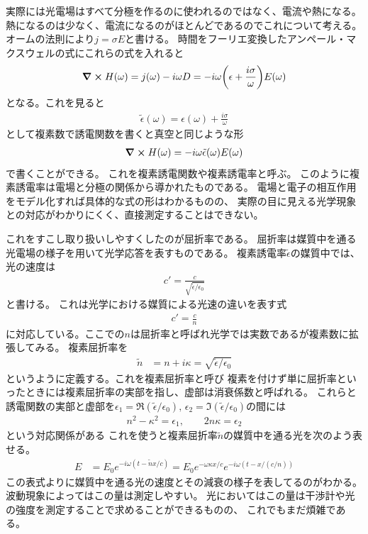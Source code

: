\documentclass[11pt,dvipdfmx,a4paper]{jsarticle}
\begin{document}
実際には光電場はすべて分極を作るのに使われるのではなく、電流や熱になる。
熱になるのは少なく、電流になるのがほとんどであるのでこれについて考える。
オームの法則により\(j=\sigma E\)と書ける。
時間をフーリエ変換したアンペール・マクスウェルの式にこれらの式を入れると
\begin{align}
    \curl H(\omega) = j(\omega) - i\omega D = -i\omega \qty(\epsilon+\frac{i\sigma}{\omega}) E(\omega)
\end{align}
となる。これを見ると
\begin{align}
    \tilde{\epsilon}(\omega) = \epsilon(\omega) + \frac{i\sigma}{\omega}
\end{align}
として複素数で誘電関数を書くと真空と同じような形
\begin{align}
    \curl H(\omega) = -i\omega \tilde{\epsilon}(\omega) E(\omega)
\end{align}
で書くことができる。
これを複素誘電関数や複素誘電率と呼ぶ。
このように複素誘電率は電場と分極の関係から導かれたものである。
電場と電子の相互作用をモデル化すれば具体的な式の形はわかるものの、
実際の目に見える光学現象との対応がわかりにくく、直接測定することはできない。

これをすこし取り扱いしやすくしたのが屈折率である。
屈折率は媒質中を通る光電場の様子を用いて光学応答を表すものである。
複素誘電率\(\tilde{\epsilon}\)の媒質中では、光の速度は
\begin{align}
    c' = \frac{c}{\sqrt{\tilde{\epsilon}/\epsilon_0}}
\end{align}
と書ける。
これは光学における媒質による光速の違いを表す式
\begin{align}
    c' = \frac{c}{n}
\end{align}
に対応している。ここでの\(n\)は屈折率と呼ばれ光学では実数であるが複素数に拡張してみる。
複素屈折率を
\begin{align}
    \tilde{n} &= n + i\kappa = \sqrt{\tilde{\epsilon}/\epsilon_0}
\end{align}
というように定義する。これを複素屈折率と呼び
複素を付けず単に屈折率といったときには複素屈折率の実部を指し、虚部は消衰係数と呼ばれる。
これらと誘電関数の実部と虚部を\(\epsilon_1=\Re(\tilde{\epsilon}/\epsilon_0),\,\epsilon_2=\Im(\tilde{\epsilon}/\epsilon_0)\)の間には
\begin{align}
    n^2-\kappa^2 = \epsilon_1,\qquad 2n\kappa = \epsilon_2
\end{align}
という対応関係がある
これを使うと複素屈折率\(\tilde{n}\)の媒質中を通る光を次のよう表せる。
\begin{align}
    E &= E_0 e^{-i\omega (t - \tilde{n}x/c)} = E_0 e^{-\omega \kappa x / c}e^{-i\omega (t - x/(c/n))}
\end{align}
この表式よりに媒質中を通る光の速度とその減衰の様子を表してるのがわかる。
波動現象によってはこの量は測定しやすい。
光においてはこの量は干渉計や光の強度を測定することで求めることができるものの、
これでもまだ煩雑である。
\end{document}
